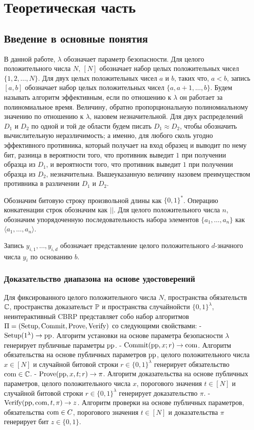\chapter{Теоретическая часть}
\section{Введение в основные понятия} %
В данной работе, $\lambda$ обозначает параметр безопасности.
Для целого положительного числа $N$, $[N]$ обозначает набор целых положительных чисел $\{1, 2, \dots, N\}$.
Для двух целых положительных чисел $a$ и $b$, таких что, $a < b$, запись $[a, b]$ обозначает набор целых положительных чисел $\{a, a + 1, \dots, b\}$.
Будем называть алгоритм эффективным, если по отношению к $\lambda$ он работает за полиномиальное время.
Величину, обратно пропорциональную полиномиальному значению по отношению к $\lambda$, назовем незначительной.
Для двух распределений $D_1$ и $D_2$ по одной и той де области будем писать $D_1 \approx D_2$, чтобы обозначить вычислительную неразличимость; а именно, для любого сколь угодно эффективного противника, который получает на вход образец и выводит по нему бит, разница в вероятности того, что противник выведит $1$ при получении образца из $D_1$, и вероятности того, что противник выведит $1$ при получении образца из $D_2$, незначительна.
Вышеуказанную величину назовем преимуществом противника в различении $D_1$ и $D_2$.

Обозначим битовую строку произвольной длины как $\{0, 1\}^*$.
Операцию конкатенации строк обозначим как $||$.
Для целого положительного числа $n$, обозначим упорядоченную последовательность набора элементов $\{a_1, \dots, a_n\}$ как $\langle a_1, \dots, a_n \rangle$.

Запись $y_{i, 1}, \dots, y_{i, d}$ обозначает представление целого положительного $d$-значного числа $y_i$ по основанию $b$.

\subsection{Доказательство диапазона на основе удостоверений} %
Для фиксированного целого положительного числа $N$, пространства обязательств $\C$, пространства доказательст $\P$ и пространства случайнойсти $\{0, 1\}^\lambda$, неинтерактивный CBRP представляет собо набор алгоритмов $\Pi = (\Setup, \Commit, \Prove, \Verify)$ со следующими свойствами:
- $\Setup(1^\lambda) \rightarrow \pp$. Алгоритм установки на основе параметра безопасности $\lambda$ генерирует публичные параметры $\pp$.
- $\Commit(\pp, x; r) \rightarrow \com$. Алгоритм обязательства на основе публичных параметров $\pp$, целого положительного числа $x \in [N]$ и случайной битовой строки $r \in \{0, 1\}^\lambda$ генерирует обязательство $\com \in \C$.
- $\Prove(\pp, x, t; r) \rightarrow \pi$. Алгоритм доказательства на основе публичных параметров, целого положительного числа $x$, порогового значения $t \in [N]$ и случайной битовой строки $r \in \{0, 1\}^\lambda$ генерирует доказательство $\pi$.
- $\Verify(\pp, \com, t, \pi) \rightarrow z$. Алгоритм проверки на основе публичных параметров, обязательства $\com \in C$, порогового значения $t \in [N]$ и доказательства $\pi$ генерирует бит $z \in \{0, 1\}$.

